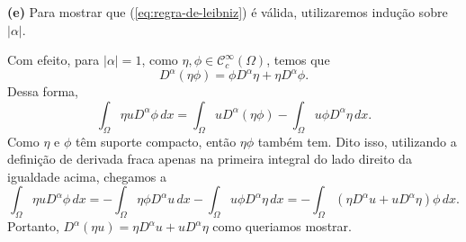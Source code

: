\documentclass[a4paper, 11pt]{book}
\theoremstyle{definition}
\newcommand{\cC}{\mathcal{C}}
\begin{document}
\begin{prf}
    \textbf{(e)} Para mostrar que (\ref{eq:regra-de-leibniz}) é válida, utilizaremos indução sobre $|\alpha|$. 
    
    Com efeito, para $|\alpha|= 1$, como $\eta,\phi \in \cC^{\infty}_c(\Omega)$, temos que
    \[
        D^{\alpha} (\eta \phi) = \phi D^{\alpha}\eta + \eta D^{\alpha} \phi.
    \]
    Dessa forma,
    \[
        \int_\Omega \eta u D^{\alpha} \phi \, dx = \int_\Omega u D^{\alpha} (\eta \phi) - \int_\Omega u\phi D^{\alpha} \eta \, dx.
    \]
    Como $\eta$ e $\phi$ têm suporte compacto, então $\eta\phi$ também tem. 
    Dito isso, utilizando a definição de derivada fraca apenas na primeira integral do lado direito da igualdade acima, chegamos a
    \[
        \int_\Omega \eta u D^{\alpha} \phi \, dx = -\int_\Omega \eta \phi D^{\alpha} u \, dx - \int_\Omega u\phi D^{\alpha} \eta \, dx = -\int_\Omega (\eta D^{\alpha}u + uD^{\alpha}\eta) \phi \,dx.
    \]
    Portanto, $D^{\alpha}(\eta u) = \eta D^{\alpha}u + uD^{\alpha}\eta$ como queriamos mostrar.


\end{prf}
\end{document}
